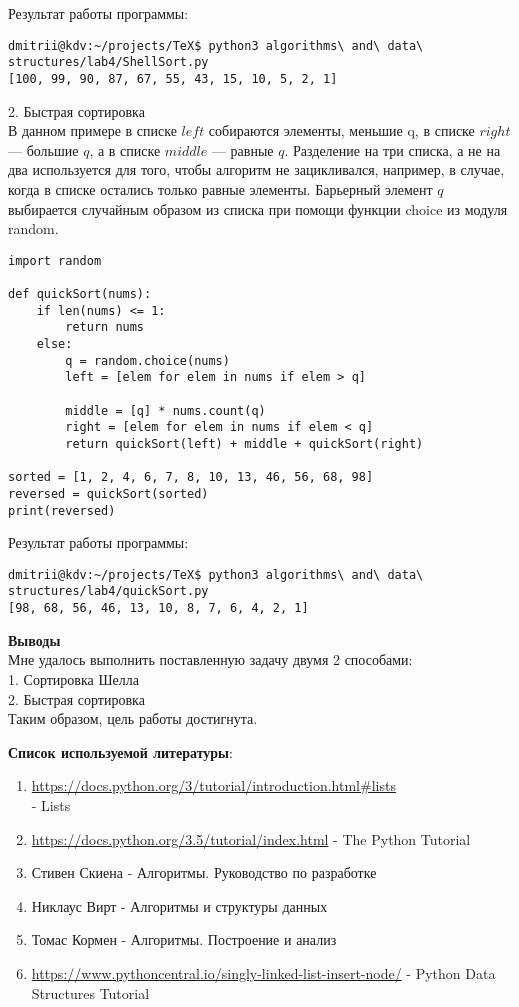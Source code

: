 \documentclass[12pt]{article}
\begin{document}
Результат работы программы:
\begin{verbatim}
dmitrii@kdv:~/projects/TeX$ python3 algorithms\ and\ data\ structures/lab4/ShellSort.py 
[100, 99, 90, 87, 67, 55, 43, 15, 10, 5, 2, 1]
\end{verbatim}

2. Быстрая сортировка \\

В данном примере в списке $left$ собираются элементы, меньшие q, в списке $right$ — большие $q$, а в списке $middle$ — равные $q$. Разделение на три списка, а не на два используется для того, чтобы алгоритм не зацикливался, например, в случае, когда в списке остались только равные элементы. Барьерный элемент $q$ выбирается случайным образом из списка при помощи функции choice из модуля random.

\begin{verbatim}
import random

def quickSort(nums):
    if len(nums) <= 1:
        return nums
    else:
        q = random.choice(nums)
        left = [elem for elem in nums if elem > q]

        middle = [q] * nums.count(q)
        right = [elem for elem in nums if elem < q]
        return quickSort(left) + middle + quickSort(right)

sorted = [1, 2, 4, 6, 7, 8, 10, 13, 46, 56, 68, 98]
reversed = quickSort(sorted)
print(reversed)
\end{verbatim}
Результат работы программы:
\begin{verbatim}
dmitrii@kdv:~/projects/TeX$ python3 algorithms\ and\ data\ structures/lab4/quickSort.py 
[98, 68, 56, 46, 13, 10, 8, 7, 6, 4, 2, 1]
\end{verbatim}

\textbf{Выводы}\\
Мне удалось выполнить поставленную задачу двумя 2 способами: \\
1. Сортировка Шелла\\
2. Быстрая сортировка \\
Таким образом, цель работы достигнута.
\par\bigskip
\textbf{Список используемой литературы}:
\begin{enumerate}
\item \url{https://docs.python.org/3/tutorial/introduction.html#lists} \\ - Lists
\item \url{https://docs.python.org/3.5/tutorial/index.html} - The Python Tutorial
\item Стивен Скиена - Алгоритмы. Руководство по разработке
\item Никлаус Вирт - Алгоритмы и структуры данных
\item Томас Кормен - Алгоритмы. Построение и анализ
\item \url{https://www.pythoncentral.io/singly-linked-list-insert-node/} - Python Data Structures Tutorial
\end{enumerate}
\end{document}
